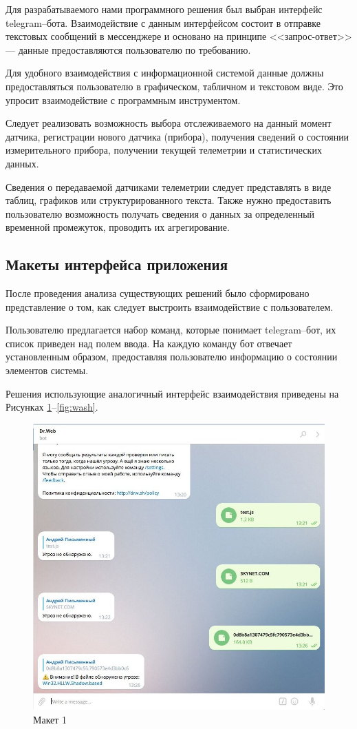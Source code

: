 \documentclass[a4paper,14pt]{extarticle}
\begin{document}
Для разрабатываемого нами программного решения был выбран интерфейс \mbox{telegram--бота}. Взаимодействие с данным интерфейсом состоит в отправке текстовых сообщений в мессенджере и основано на принципе <<запрос-ответ>> --- данные предоставляются пользователю по требованию.

Для удобного взаимодействия с информационной системой данные должны предоставляться пользователю в графическом, табличном и текстовом виде. Это упросит взаимодействие с программным инструментом.


Следует реализовать возможность выбора отслеживаемого на данный момент датчика, регистрации нового датчика (прибора), получения сведений о состоянии измерительного прибора, получении текущей телеметрии и статистических данных.

Сведения о передаваемой датчиками телеметрии следует представлять в виде таблиц, графиков или структурированного текста. Также нужно предоставить пользователю возможность получать сведения о данных за определенный временной промежуток, проводить их агрегирование.



\subsection{Макеты интерфейса приложения}

После проведения анализа существующих решений было сформировано представление о том, как следует выстроить взаимодействие с пользователем. 

Пользователю предлагается набор команд, которые понимает \mbox{telegram--бот}, их список приведен над полем ввода. На каждую команду бот отвечает установленным образом, предоставляя пользователю информацию о состоянии элементов системы. 

Решения использующие аналогичный интерфейс взаимодействия приведены на Рисунках \mbox{\ref{fig:drewb}--\ref{fig:wash}}.


\begin{figure}[h!]
	\centering
	\includegraphics[width=0.5\linewidth]{images/mokups/drewb}
	\caption{Макет 1}
	\label{fig:drewb}
\end{figure}
\end{document}
